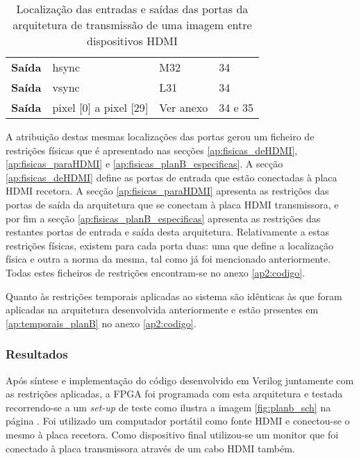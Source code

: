 \begin{table}[h!]
\begin{tabular}{rlll}
			\multicolumn{1}{r|}{\textbf{Saída}}   & hsync                                 & M32                                      & 34                                         \\
			\multicolumn{1}{r|}{\textbf{Saída}}   & vsync                                 & L31                                      & 34                                         \\
			\multicolumn{1}{r|}{\textbf{Saída}}   & pixel {[}0{]} a pixel {[}29{]}        & Ver anexo                                & 34 e 35                                    \\ \hline
		\end{tabular}%
	\captionsetup{width=0.80\linewidth}
	\caption{Localização das entradas e saídas das portas da arquitetura de transmissão de uma imagem entre dispositivos HDMI}
	\label{table:LOCplanB_simples}
\end{table}



A atribuição destas mesmas localizações das portas gerou um ficheiro de restrições físicas que é apresentado nas secções \ref{ap:fisicas_deHDMI}, \ref{ap:fisicas_paraHDMI} e \ref{ap:fisicas_planB_especificas}. A secção \ref{ap:fisicas_deHDMI} define as portas de entrada que estão conectadas à placa HDMI recetora. A secção \ref{ap:fisicas_paraHDMI} apresenta as restrições das portas de saída da arquitetura que se conectam à placa HDMI transmissora, e por fim a secção \ref{ap:fisicas_planB_especificas} apresenta as restrições das restantes portas de entrada e saída desta arquitetura. Relativamente a estas restrições físicas, existem para cada porta duas: uma que define a localização física e outra a norma da mesma, tal como já foi mencionado anteriormente. Todas estes ficheiros de restrições encontram-se no anexo \ref{ap2:codigo}.

Quanto às restrições temporais aplicadas ao sistema são idênticas às que foram aplicadas na arquitetura desenvolvida anteriormente e estão presentes em \ref{ap:temporais_planB} no anexo \ref{ap2:codigo}.

\subsubsection*{Resultados}
Após síntese e implementação do código desenvolvido em Verilog juntamente com as restrições aplicadas, a FPGA foi programada com esta arquitetura e testada recorrendo-se a um \textit{set-up} de teste como ilustra a imagem \ref{fig:planb_sch} na página \pageref{fig:planb_sch}. Foi utilizado um computador portátil como fonte HDMI e conectou-se o mesmo à placa recetora. Como dispositivo final utilizou-se um monitor que foi conectado à placa transmissora através de um cabo HDMI também. 


